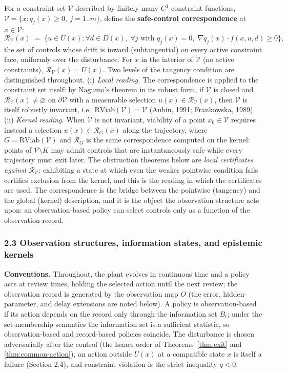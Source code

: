 \documentclass[11pt]{article}
\theoremstyle{definition}
\begin{document}
For a constraint set \(\mathcal{V}\) described by finitely many \(C^1\)
constraint functions,
\(\mathcal{V} = \{ x : q_j(x) \ge 0,\ j = 1..m \}\), define the
\textbf{safe-control correspondence} at \(x \in \mathcal{V}\):
\[\mathcal{R}_{\mathcal{V}}(x) \;=\; \Big\{ u \in U(x) : \forall d \in D(x),\; \forall j \text{ with } q_j(x) = 0,\; \nabla q_j(x) \cdot f(x, u, d) \ge 0 \Big\},\]
the set of controls whose drift is inward (subtangential) on every
active constraint face, uniformly over the disturbance. For \(x\) in the
interior of \(\mathcal{V}\) (no active constraints),
\(\mathcal{R}_{\mathcal{V}}(x) = U(x)\). Two levels of the tangency condition are distinguished throughout. (i) \emph{Local reading.} The correspondence is applied to the constraint set itself: by Nagumo's theorem in
its robust form, if \(\mathcal{V}\) is closed and
\(\mathcal{R}_{\mathcal{V}}(x) \neq \varnothing\) on
\(\partial\mathcal{V}\) with a measurable selection
\(u(x) \in \mathcal{R}_{\mathcal{V}}(x)\), then \(\mathcal{V}\) is
itself robustly invariant,
i.e.~\(\mathrm{RViab}(\mathcal{V}) = \mathcal{V}\) (Aubin, 1991;
Frankowska, 1989). (ii) \emph{Kernel reading.} When \(\mathcal{V}\) is not invariant, viability of a point \(x_0 \in \mathcal{V}\) requires instead a selection \(u(x) \in \mathcal{R}_G(x)\) along the trajectory, where \(G = \mathrm{RViab}(\mathcal{V})\) and \(\mathcal{R}_G\) is the same correspondence computed on the kernel: points of
\(\mathcal{V} \setminus K\) may admit controls that are instantaneously
safe while every trajectory must exit later. The obstruction
theorems below are \emph{local certificates against
\(\mathcal{R}_{\mathcal{V}}\)}: exhibiting a state at which even the
weaker pointwise condition fails certifies exclusion from the kernel,
and this is the reading in which the certificates are used. The
correspondence is the bridge between the pointwise (tangency) and the
global (kernel) description, and it is the object the observation
structure acts upon: an observation-based policy can select controls
only as a function of the observation record.

\subsubsection{2.3 Observation structures, information states, and
epistemic
kernels}\label{observation-structures-information-states-and-epistemic-kernels}

\textbf{Conventions.} Throughout, the plant evolves in continuous time
and a policy acts at review times, holding the selected action until the
next review; the observation record is generated by the observation map
\(O\) (the error, hidden-parameter, and delay extensions are noted
below). A policy is observation-based if its action depends on the
record only through the information set \(B_t\); under the
set-membership semantics the information set is a sufficient statistic,
so observation-based and record-based policies coincide. The disturbance
is chosen adversarially after the control (the Isaacs order of
Theorems~\ref{thm:exit} and \ref{thm:common-action}), an action outside
\(U(x)\) at a compatible state \(x\) is itself a failure (Section 2.4),
and constraint violation is the strict inequality \(q<0\).
\end{document}

